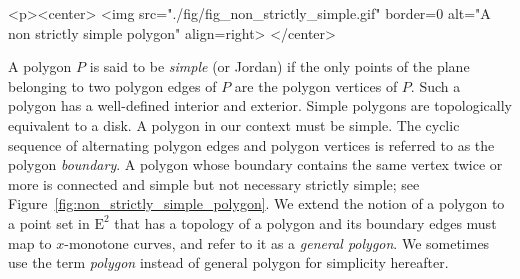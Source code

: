 \newpage
\lcTex{%
  \setlength{\widthRight}{4cm}
  \setlength{\widthLeft}{\widthLineReal}
  \addtolength{\widthLeft}{-\widthRight}
  \begin{minipage}{\widthLeft}
}
\label{fig:non_strictly_simple_polygon}
\begin{ccHtmlOnly}
  <p><center>
    <img src="./fig/fig_non_strictly_simple.gif" border=0 alt="A non strictly simple polygon" align=right>
  </center>
\end{ccHtmlOnly}
A polygon $P$ is said to be {\em simple} (or Jordan) if the
only points of the plane belonging to two polygon edges of $P$ are the
polygon vertices of $P$. Such a polygon has a well-defined interior
and exterior. Simple polygons are topologically equivalent to
a disk. A polygon in our context must be simple. The cyclic
sequence of alternating polygon edges and polygon vertices is referred
to as the polygon {\em boundary}. A polygon whose boundary contains the
same vertex twice or more is connected and simple but not
necessary strictly simple; see Figure~\ref{fig:non_strictly_simple_polygon}. 
We extend the notion of a polygon to a point set in $\mathrm{E}^2$ that has 
a topology of a polygon and its boundary edges must map to $x$-monotone
curves, and refer to it as a {\em general polygon}. We sometimes use
the term {\em polygon} instead of general polygon for simplicity hereafter.


